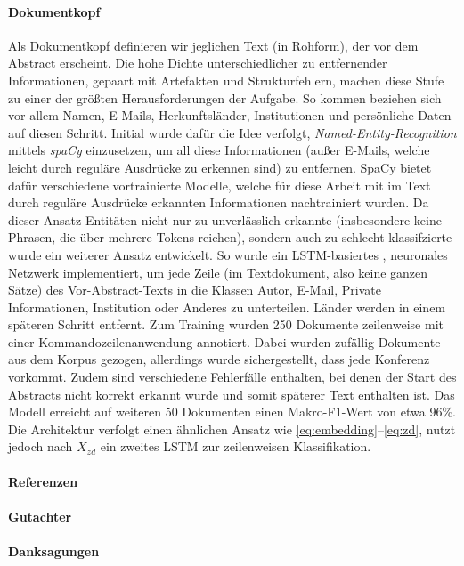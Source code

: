 \documentclass[bachelor,german]{info1thesis}
\begin{document}
\paragraph{Dokumentkopf} Als Dokumentkopf definieren wir jeglichen Text (in Rohform), der vor dem Abstract erscheint. Die hohe Dichte unterschiedlicher zu entfernender Informationen, gepaart mit Artefakten und Strukturfehlern, machen diese Stufe zu einer der größten Herausforderungen der Aufgabe. So kommen beziehen sich vor allem Namen, E-Mails, Herkunftsländer, Institutionen und persönliche Daten auf diesen Schritt. Initial wurde dafür die Idee verfolgt, \textit{Named-Entity-Recognition} mittels \textit{spaCy} \cite{spacy2} einzusetzen, um all diese Informationen (außer E-Mails, welche leicht durch reguläre Ausdrücke zu erkennen sind) zu entfernen. SpaCy bietet dafür verschiedene vortrainierte Modelle, welche für diese Arbeit mit im Text durch reguläre Ausdrücke erkannten Informationen nachtrainiert wurden. Da dieser Ansatz Entitäten nicht nur zu unverlässlich erkannte (insbesondere keine Phrasen, die über mehrere Tokens reichen), sondern auch zu schlecht klassifzierte wurde ein weiterer Ansatz entwickelt. So wurde ein LSTM-basiertes \cite{Hochreiter1997}, neuronales Netzwerk implementiert, um jede Zeile (im Textdokument, also keine ganzen Sätze) des Vor-Abstract-Texts in die Klassen Autor, E-Mail, Private Informationen, Institution oder Anderes zu unterteilen. Länder werden in einem späteren Schritt entfernt.  Zum Training wurden 250 Dokumente zeilenweise mit einer Kommandozeilenanwendung annotiert. Dabei wurden zufällig Dokumente aus dem Korpus gezogen, allerdings wurde sichergestellt, dass jede Konferenz vorkommt. Zudem sind verschiedene Fehlerfälle enthalten, bei denen der Start des Abstracts nicht korrekt erkannt wurde und somit späterer Text enthalten ist. Das Modell erreicht auf weiteren 50 Dokumenten einen Makro-F1-Wert von etwa 96\%. Die Architektur verfolgt einen ähnlichen Ansatz wie \autoref{eq:embedding}--\ref{eq:zd}, nutzt jedoch nach $X_{zd}$ ein zweites LSTM zur zeilenweisen Klassifikation.
\paragraph{Referenzen}
\paragraph{Gutachter}
\paragraph{Danksagungen}
\end{document}
